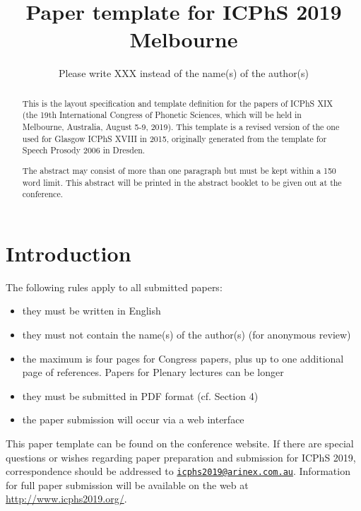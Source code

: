 \documentclass[a4paper,11pt,twocolumn]{article}
\title{}
\author{}
\date{}
\begin{document}
\title{Paper template for {ICPhS} 2019 Melbourne}
\author{Please write XXX instead of the name(s) of the author(s)}


\maketitle

\begin{abstract}
This is the layout specification and template definition for the papers of 
ICPhS XIX (the 19th International Congress of Phonetic Sciences, which will be 
held in Melbourne, Australia, August 5-9, 2019). This template is a revised 
version of the one used for Glasgow ICPhS XVIII in 2015, originally generated 
from the template for Speech Prosody 2006 in Dresden.

The abstract may consist of more than one paragraph but must be kept within a 
150 word limit. This abstract will be printed in the abstract booklet to be 
given out at the conference.
\end{abstract}


\section{Introduction}

The following rules apply to all submitted papers:

\begin{itemize}
  \item they must be written in English
  \item they must not contain the name(s) of the author(s) (for anonymous 
  review)
  \item the maximum is four pages for Congress papers, plus up to one 
  additional page of references. Papers for Plenary lectures can be longer
  \item they must be submitted in PDF format (cf. Section 4)
  \item the paper submission will occur via a web interface
\end{itemize}

This paper template can be found on the conference website. If there are
special questions or wishes regarding paper preparation and submission
for ICPhS 2019, correspondence should be addressed to
\href{mailto:icphs2019@arinex.com.au}{\nolinkurl{icphs2019@arinex.com.au}}.
Information for full paper submission will be available on the web at
\url{http://www.icphs2019.org/}.
\end{document}
